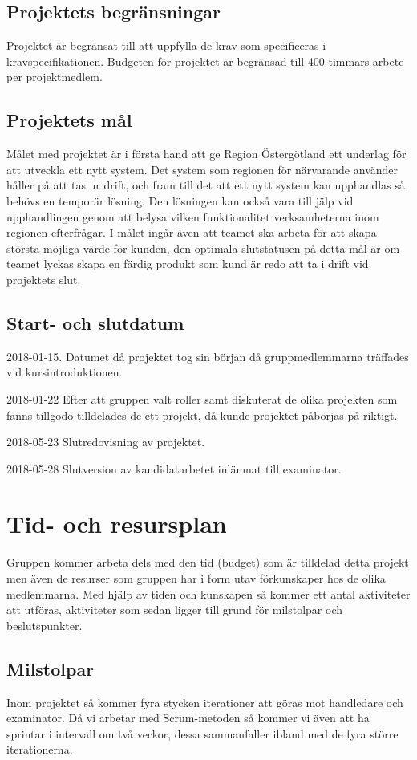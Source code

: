 \documentclass[a4paper,10pt, twoside]{article}
\begin{document}
\subsection{Projektets begränsningar}
Projektet är begränsat till att uppfylla de krav som specificeras i kravspecifikationen. Budgeten för projektet är begränsad till 400 timmars arbete per projektmedlem.
\subsection{Projektets mål}
Målet med projektet är i första hand att ge Region Östergötland ett underlag för att utveckla ett nytt system. Det system som regionen för närvarande använder håller på att tas ur drift, och fram till det att ett nytt system kan upphandlas så behövs en temporär lösning. Den lösningen kan också vara till jälp vid upphandlingen genom att belysa vilken funktionalitet verksamheterna inom regionen efterfrågar. I målet ingår även att teamet ska arbeta för att skapa största möjliga värde för kunden, den optimala slutstatusen på detta mål är om teamet lyckas skapa en färdig produkt som kund är redo att ta i drift vid projektets slut.
\subsection{Start- och slutdatum}
2018-01-15.
Datumet då projektet tog sin början då gruppmedlemmarna träffades vid kursintroduktionen.

2018-01-22
Efter att gruppen valt roller samt diskuterat de olika projekten som fanns tillgodo tilldelades de ett projekt, då kunde projektet påbörjas på riktigt.

2018-05-23
Slutredovisning av projektet.

2018-05-28
Slutversion av kandidatarbetet inlämnat till examinator.

\newpage

\section{Tid- och resursplan}
Gruppen kommer arbeta dels med den tid (budget) som är tilldelad detta projekt men även de resurser som gruppen har i form utav förkunskaper hos de olika medlemmarna. Med hjälp av tiden och kunskapen så kommer ett antal aktiviteter att utföras, aktiviteter som sedan ligger till grund för milstolpar och beslutspunkter.
\subsection{Milstolpar}
Inom projektet så kommer fyra stycken iterationer att göras mot handledare och examinator. Då vi arbetar med Scrum-metoden så kommer vi även att ha sprintar i intervall om två veckor, dessa sammanfaller ibland med de fyra större iterationerna.
\end{document}
